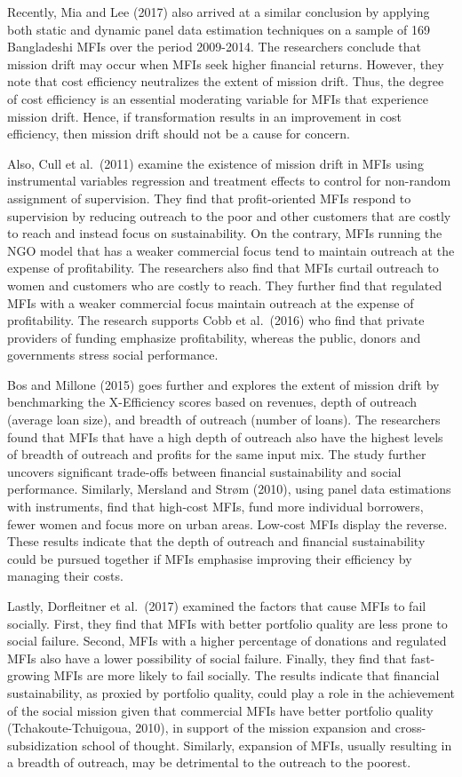 \documentclass[a4paper, nobind]{templates/ociamthesis}
\begin{document}
Recently, Mia and Lee (2017) also arrived at a similar conclusion by applying both static and dynamic panel data estimation techniques on a sample of 169 Bangladeshi MFIs over the period 2009-2014. The researchers conclude that mission drift may occur when MFIs seek higher financial returns. However, they note that cost efficiency neutralizes the extent of mission drift. Thus, the degree of cost efficiency is an essential moderating variable for MFIs that experience mission drift. Hence, if transformation results in an improvement in cost efficiency, then mission drift should not be a cause for concern.

Also, Cull et al.~(2011) examine the existence of mission drift in MFIs using instrumental variables regression and treatment effects to control for non-random assignment of supervision. They find that profit-oriented MFIs respond to supervision by reducing outreach to the poor and other customers that are costly to reach and instead focus on sustainability. On the contrary, MFIs running the NGO model that has a weaker commercial focus tend to maintain outreach at the expense of profitability. The researchers also find that MFIs curtail outreach to women and customers who are costly to reach. They further find that regulated MFIs with a weaker commercial focus maintain outreach at the expense of profitability. The research supports Cobb et al.~(2016) who find that private providers of funding emphasize profitability, whereas the public, donors and governments stress social performance.

Bos and Millone (2015) goes further and explores the extent of mission drift by benchmarking the X-Efficiency scores based on revenues, depth of outreach (average loan size), and breadth of outreach (number of loans). The researchers found that MFIs that have a high depth of outreach also have the highest levels of breadth of outreach and profits for the same input mix. The study further uncovers significant trade-offs between financial sustainability and social performance. Similarly, Mersland and Strøm (2010), using panel data estimations with instruments, find that high-cost MFIs, fund more individual borrowers, fewer women and focus more on urban areas. Low-cost MFIs display the reverse. These results indicate that the depth of outreach and financial sustainability could be pursued together if MFIs emphasise improving their efficiency by managing their costs.

Lastly, Dorfleitner et al.~(2017) examined the factors that cause MFIs to fail socially. First, they find that MFIs with better portfolio quality are less prone to social failure. Second, MFIs with a higher percentage of donations and regulated MFIs also have a lower possibility of social failure. Finally, they find that fast-growing MFIs are more likely to fail socially. The results indicate that financial sustainability, as proxied by portfolio quality, could play a role in the achievement of the social mission given that commercial MFIs have better portfolio quality (Tchakoute-Tchuigoua, 2010), in support of the mission expansion and cross-subsidization school of thought. Similarly, expansion of MFIs, usually resulting in a breadth of outreach, may be detrimental to the outreach to the poorest.
\end{document}
